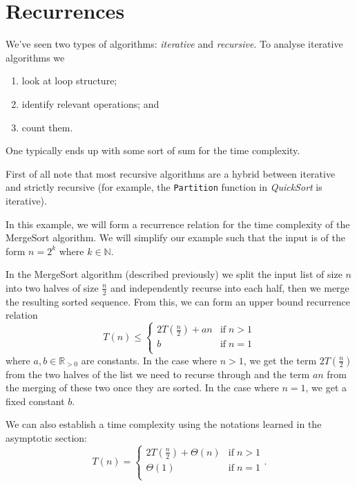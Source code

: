 \chapter{Recurrences}

We've seen two types of algorithms: \emph{iterative} and \emph{recursive}. To analyse iterative algorithms we
\begin{enumerate}
    \item look at loop structure;
    \item identify relevant operations; and
    \item count them.
\end{enumerate}

One typically ends up with some sort of sum for the time complexity.

\begin{remark}
    First of all note that most recursive algorithms are a hybrid between iterative and strictly recursive (for example, the \texttt{Partition} function in \emph{QuickSort} is iterative).
\end{remark}

\begin{example}
    In this example, we will form a recurrence relation for the time complexity of the MergeSort algorithm. We will simplify our example such that the input is of the form $n=2^k$ where $k\in\mathbb N$. 
    
    In the MergeSort algorithm (described previously) we split the input list of size $n$ into two halves of size $\frac n2$ and independently recurse into each half, then we merge the resulting sorted sequence. From this, we can form an upper bound recurrence relation
    \[
        T(n)\leq
        \begin{cases}
            2T(\frac n2)+an&\text{if}\;n>1\\
            b&\text{if}\;n=1\\
        \end{cases}
    \]
    where $a,b\in\mathbb R_{>0}$ are constants. In the case where $n>1$, we get the term $2T\left(\frac n2\right)$ from the two halves of the list we need to recurse through and the term $an$ from the merging of these two once they are sorted. In the case where $n=1$, we get a fixed constant $b$.
    
    We can also establish a time complexity using the notations learned in the asymptotic section: 
    \[
        T(n)=
        \begin{cases}
            2T(\frac n2)+\Theta(n)&\text{if}\;n>1\\
            \Theta(1)&\text{if}\;n=1\\
        \end{cases}
        .
    \]
\end{example}

